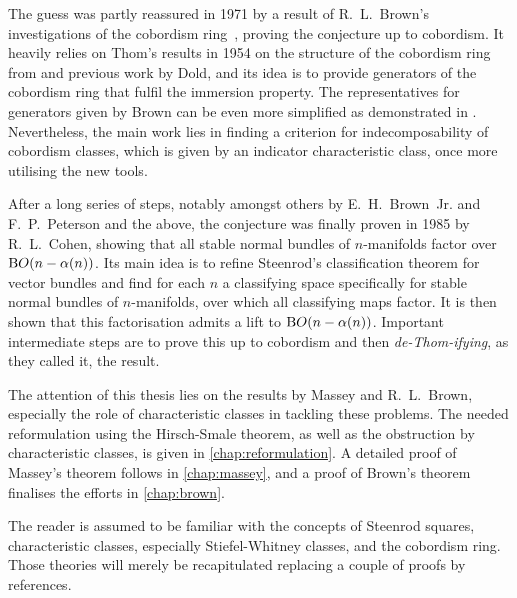 The guess was partly reassured in 1971 by a result of R.~L.~Brown's
investigations of the cobordism ring~\cite{brown}, proving the
conjecture up to cobordism. It heavily relies on Thom's results in
1954 on the structure of the cobordism ring~\cite{thomfrench} from and
previous work by Dold, and its idea is to provide generators of the
cobordism ring that fulfil the immersion property. The representatives
for generators given by Brown can be even more simplified as
demonstrated in \cite{immersionconj}.
Nevertheless, the main work lies in finding a criterion for
indecomposability of cobordism classes, which is given by an indicator
characteristic class, once more utilising the new tools.

After a long series of steps, notably amongst others by
E.~H.~Brown~Jr. and F.~P.~Peterson and the above, the conjecture was
finally proven in 1985 by R.~L.~Cohen, showing that all stable normal
bundles of $n$-manifolds factor over $\mathrm{B}O(n-\alpha(n))$.
Its main idea is to refine Steenrod's classification theorem for
vector bundles and find for each $n$ a classifying space specifically
for stable normal bundles of $n$-manifolds, over which all classifying
maps factor. It is then shown that this factorisation admits a lift to
 $\mathrm{B}O(n-\alpha(n))$.
Important intermediate steps are to prove this up to cobordism and then
\emph{de-Thom-ifying}, as they called it, the result.

The attention of this thesis lies on the results by Massey and
R.~L.~Brown, especially the role of characteristic classes in tackling
these problems.
The needed reformulation using the Hirsch-Smale theorem, as well as
the obstruction by characteristic classes, is given in
\autoref{chap:reformulation}.
A detailed proof of Massey's theorem follows in \autoref{chap:massey},
and a proof of Brown's theorem finalises the efforts in
\autoref{chap:brown}.

The reader is assumed to be familiar with the concepts of Steenrod
squares, characteristic classes, especially Stiefel-Whitney classes,
and the cobordism ring. Those theories will merely be recapitulated
replacing a couple of proofs by references.

